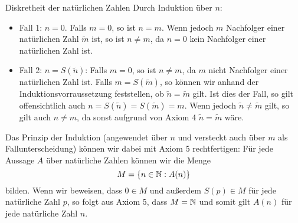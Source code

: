 \documentclass{pizzablatt}
\begin{document}

\begin{aufgabe}{Diskretheit der natürlichen Zahlen}
Durch Induktion über $n$:
\begin{itemize}
\item Fall 1: $n = 0$. Falls $m = 0$, so ist $n = m$. Wenn jedoch $m$ Nachfolger einer natürlichen Zahl $\widetilde{m}$ ist, so ist $n \not= m$, da $n = 0$ kein Nachfolger einer natürlichen Zahl ist.
\item Fall 2: $n = S(\widetilde{n})$: Falls $m = 0$, so ist $n \not= m$, da $m$ nicht Nachfolger einer natürlichen Zahl ist. Falls $m = S(\widetilde{m})$, so können wir anhand der Induktionsvorraussetzung feststellen, ob $\widetilde{n} = \widetilde{m}$ gilt. Ist dies der Fall, so gilt offensichtlich auch $n = S(\widetilde{n}) = S(\widetilde{m}) = m$. Wenn jedoch $\widetilde{n} \not= \widetilde{m}$ gilt, so gilt auch $n \not= m$, da sonst aufgrund von Axiom 4 $\widetilde{n} = \widetilde{m}$ wäre.
\end{itemize}

Das Prinzip der Induktion (angewendet über $n$ und versteckt auch über $m$ als Fallunterscheidung) können wir dabei mit Axiom 5 rechtfertigen: Für jede Aussage $A$ über natürliche Zahlen können wir die Menge
\[ M = \{ n \in \mathbb{N} : A(n) \} \]
bilden. Wenn wir beweisen, dass $0 \in M$ und außerdem $S(p) \in M$ für jede natürliche Zahl $p$, so folgt aus Axiom 5, dass $M = \mathbb{N}$ und somit gilt $A(n)$ für jede natürliche Zahl $n$.
\end{aufgabe}
\end{document}
